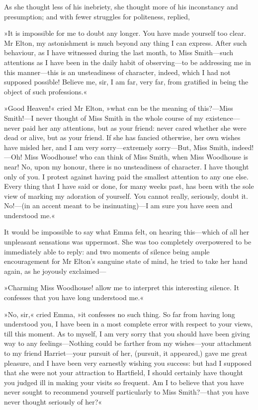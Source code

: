 As she thought less of his inebriety, she thought more of his inconstancy and presumption; and with fewer struggles for politeness, replied,

»It is impossible for me to doubt any longer. You have made yourself too clear. Mr Elton, my astonishment is much beyond any thing I can express. After such behaviour, as I have witnessed during the last month, to Miss Smith—such attentions as I have been in the daily habit of observing—to be addressing me in this manner—this is an unsteadiness of character, indeed, which I had not supposed possible! Believe me, sir, I am far, very far, from gratified in being the object of such professions.«

»Good Heaven!« cried Mr Elton, »what can be the meaning of this?—Miss Smith!—I never thought of Miss Smith in the whole course of my existence—never paid her any attentions, but as your friend: never cared whether she were dead or alive, but as your friend. If she has fancied otherwise, her own wishes have misled her, and I am very sorry—extremely sorry—But, Miss Smith, indeed!—Oh! Miss Woodhouse! who can think of Miss Smith, when Miss Woodhouse is near! No, upon my honour, there is no unsteadiness of character. I have thought only of you. I protest against having paid the smallest attention to any one else. Every thing that I have said or done, for many weeks past, has been with the sole view of marking my adoration of yourself. You cannot really, seriously, doubt it. No!—(in an accent meant to be insinuating)—I am sure you have seen and understood me.«

It would be impossible to say what Emma felt, on hearing this—which of all her unpleasant sensations was uppermost. She was too completely overpowered to be immediately able to reply: and two moments of silence being ample encouragement for Mr Elton's sanguine state of mind, he tried to take her hand again, as he joyously exclaimed—

»Charming Miss Woodhouse! allow me to interpret this interesting silence. It confesses that you have long understood me.«

»No, sir,« cried Emma, »it confesses no such thing. So far from having long understood you, I have been in a most complete error with respect to your views, till this moment. As to myself, I am very sorry that you should have been giving way to any feelings—Nothing could be farther from my wishes—your attachment to my friend Harriet—your pursuit of her, (pursuit, it appeared,) gave me great pleasure, and I have been very earnestly wishing you success: but had I supposed that she were not your attraction to Hartfield, I should certainly have thought you judged ill in making your visits so frequent. Am I to believe that you have never sought to recommend yourself particularly to Miss Smith?—that you have never thought seriously of her?«

